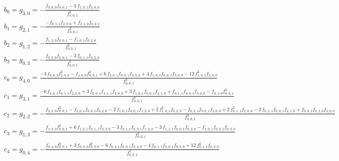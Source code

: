 \begin{eqnarray*}
&b_0=g_{3,0}=-{\frac { f_{3,0,0} f_{0,0,1} -3\, f_{1,0,1} f_{2,0,0} }{
f_{0,0,1} ^{2}}}
\\
&b_1=g_{2,1}=-{\frac {-  f_{0,1,1}      f_{2,0,0}    +  f_{2,1,0}    f_{0,0,1}  }{  f_{0,0,1}    ^{2}}}
\\
&b_2=g_{1,2}=-{\frac {  f_{1,2,0}    f_{0,0,1}  -  f_{1,0,1}      f_{0,2,0}    }{  f_{0,0,1}    ^{2}}}
\\
&b_3=g_{0,3}=-{\frac {  f_{0,3,0}    f_{0,0,1}  -3\,  f_{0,1,1}      f_{0,2,0}    }{  f_{0,0,1}    ^{2}}}
\\
&c_0=g_{4,0}={\frac {-3\,  f_{0,0,2}        f_{2,0,0}      ^{2}-  f_{4,0,0}      f_{0,0,1}    ^{2}+6\,  f_{2,0,1}    f_{0,0,1}    f_{2,0,0}    +4\,  f_{1,0,1}    f_{0,0,1}    f_{3,0,0}    -12\,    f_{1,0,1}      ^{2}  f_{2,0,0}    }{  f_{0,0,1}    ^{3}}}
\\
&c_1=g_{3,1}={\frac {-6\,  f_{1,0,1}      f_{0,1,1}      f_{2,0,0}    +3\,f_{0,0,1}    f_{1,1,1}      f_{2,0,0}    +3\,  f_{1,0,1}    f_{0,0,1}    f_{2,1,0}    +  f_{0,1,1}    f_{0,0,1}    f_{3,0,0}    -  f_{3,1,0}      f_{0,0,1}    ^{2}}{  f_{0,0,1}    ^{3}}}
\\
&c_2=g_{2,2}=-{\frac {  f_{2,2,0}      f_{0,0,1}    ^{2}-  f_{2,0,1}   f_{0,0,1}    f_{0,2,0}    -2\,  f_{1,0,1}    f_{0,0,1}    f_{1,2,0}    +2\,    f_{1,0,1}      ^{2}  f_{0,2,0}    -  f_{0,2,1}    f_{0,0,1}    f_{2,0,0}    +2\,    f_{0,1,1}      ^{2}  f_{2,0,0}    -2\,  f_{0,1,1}    f_{0,0,1}    f_{2,1,0}    +  f_{0,0,2}      f_{0,2,0}      f_{2,0,0}    }{  f_{0,0,1}    ^{3}}}
\\
&c_3=g_{1,3}=-{\frac {  f_{1,3,0}      f_{0,0,1}    ^{2}+6\,  f_{1,0,1}      f_{0,1,1}      f_{0,2,0}    -3\,  f_{0,1,1}    f_{0,0,1}    f_{1,2,0}    -3\,  f_{1,1,1}    f_{0,0,1}    f_{0,2,0}    -  f_{1,0,1}    f_{0,0,1}    f_{0,3,0}    }{  f_{0,0,1}    ^{3}}}
\\
&c_4=g_{0,4}=-{\frac {  f_{0,4,0}     f_{0,0,1}    ^{2}+3\,  f_{0,0,2}        f_{0,2,0}      ^{2}-6\,  f_{0,2,1}    f_{0,0,1}    f_{0,2,0}    -4\,  f_{0,1,1}    f_{0,0,1}    f_{0,3,0}    +12\,    f_{0,1,1}      ^{2}  f_{0,2,0}    }{  f_{0,0,1}    ^{3}}}
\end{eqnarray*} 

